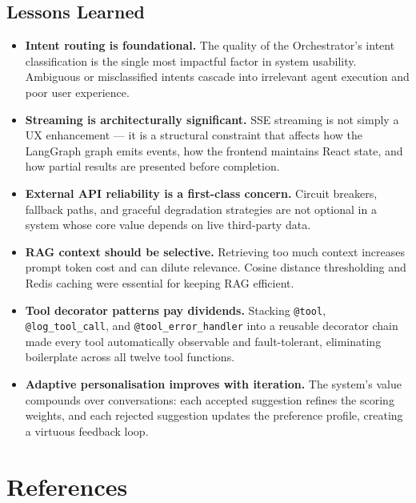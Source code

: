 \documentclass[12pt, a4paper]{article}
\begin{document}
\subsection{Lessons Learned}

\begin{itemize}[leftmargin=1.5cm, itemsep=0.4em]
  \item \textbf{Intent routing is foundational.} The quality of the Orchestrator's intent classification is the single most impactful factor in system usability. Ambiguous or misclassified intents cascade into irrelevant agent execution and poor user experience.

  \item \textbf{Streaming is architecturally significant.} SSE streaming is not simply a UX enhancement --- it is a structural constraint that affects how the LangGraph graph emits events, how the frontend maintains React state, and how partial results are presented before completion.

  \item \textbf{External API reliability is a first-class concern.} Circuit breakers, fallback paths, and graceful degradation strategies are not optional in a system whose core value depends on live third-party data.

  \item \textbf{RAG context should be selective.} Retrieving too much context increases prompt token cost and can dilute relevance. Cosine distance thresholding and Redis caching were essential for keeping RAG efficient.

  \item \textbf{Tool decorator patterns pay dividends.} Stacking \texttt{@tool}, \texttt{@log\_tool\_call}, and \texttt{@tool\_error\_handler} into a reusable decorator chain made every tool automatically observable and fault-tolerant, eliminating boilerplate across all twelve tool functions.

  \item \textbf{Adaptive personalisation improves with iteration.} The system's value compounds over conversations: each accepted suggestion refines the scoring weights, and each rejected suggestion updates the preference profile, creating a virtuous feedback loop.
\end{itemize}

\section*{References}
\end{document}

